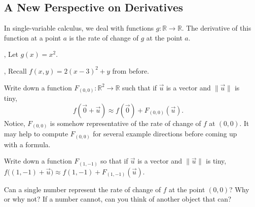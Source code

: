 \documentclass[letter]{article}
\newcommand{\R}{\mathbb{R}}
\renewcommand{\emph}[1]{{\color{defcolor} \textbf{\textit{##1}}}}
\begin{document}
\subsection*{A New Perspective on Derivatives}

	In single-variable calculus, we deal with functions $g:\R\to\R$.  The derivative of this function
	at a point $a$ is the rate of change of $g$ at the point $a$.

	\sep
	Let $g(x)=x^2$.

	\sep
	Recall $f(x,y)=2(x-3)^2+y$ from before.
	\begin{Enum}
		\item Write down a function $F_{(0,0)}:\R^2\to\R$ such that if $\vec u$ is a vector
			and $\|\vec u\|$ is tiny, 
			\[
				f(\vec 0+\vec u)\approx f(\vec 0) + F_{(0,0)}(\vec u).
			\]
			Notice, $F_{(0,0)}$ is somehow representative of the rate of change of $f$ at $(0,0)$.
			It may help to compute $F_{(0,0)}$ for several example directions before coming up
			with a formula.
		\item Write down a function $F_{(1,-1)}$ so that if $\vec u$ is a vector and $\|\vec u\|$ is
			tiny, $f\Big((1,-1)+\vec u\Big)\approx f(1,-1)+F_{(1,-1)}(\vec u)$.
		\item Can a single number represent the rate of change of $f$ at the point $(0,0)$?  Why or why not?
			If a number cannot, can you think of another object that can?
	\end{Enum}

\newpage

\end{document}
